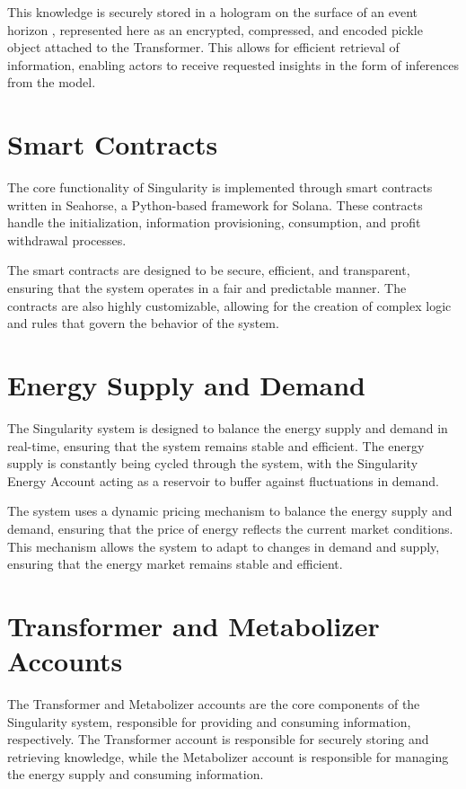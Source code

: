 \documentclass{article}
\begin{document}
This knowledge is securely stored in a hologram \cite{bousso2002holographic} on the surface of an event horizon \cite{englehardt2017decoding}, represented here as an encrypted, compressed, and encoded pickle object attached to the Transformer. This allows for efficient retrieval of information, enabling actors to receive requested insights in the form of inferences from the model.

\section{Smart Contracts}
The core functionality of Singularity is implemented through smart contracts written in Seahorse, a Python-based framework for Solana. These contracts handle the initialization, information provisioning, consumption, and profit withdrawal processes.

The smart contracts are designed to be secure, efficient, and transparent, ensuring that the system operates in a fair and predictable manner. The contracts are also highly customizable, allowing for the creation of complex logic and rules that govern the behavior of the system.

\section{Energy Supply and Demand}
The Singularity system is designed to balance the energy supply and demand in real-time, ensuring that the system remains stable and efficient. The energy supply is constantly being cycled through the system, with the Singularity Energy Account acting as a reservoir to buffer against fluctuations in demand.

The system uses a dynamic pricing mechanism to balance the energy supply and demand, ensuring that the price of energy reflects the current market conditions. This mechanism allows the system to adapt to changes in demand and supply, ensuring that the energy market remains stable and efficient.

\newpage

\section{Transformer and Metabolizer Accounts}
The Transformer and Metabolizer accounts are the core components of the Singularity system, responsible for providing and consuming information, respectively. The Transformer account is responsible for securely storing and retrieving knowledge, while the Metabolizer account is responsible for managing the energy supply and consuming information.
\end{document}

